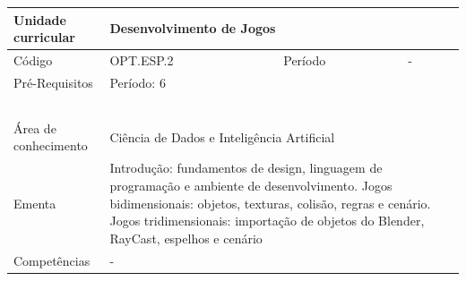 \clearpage
\newpage

\begin{quadro}[ht!]
  \centering\scriptsize
\caption{Unidade Curricular Desenvolvimento de Jogos}

\begin{tabular}{|p{2.5cm}|p{2.5cm}|p{2.5cm}|p{2.5cm}|p{2.5cm}|}\hline

  Unidade curricular & \multicolumn{4}{p{10cm}|}{ Desenvolvimento de Jogos }\\\hline
  Código & OPT.ESP.2 & Período & \multicolumn{2}{p{5cm}|}{ - }\\\hline
  Pré-Requisitos & \multicolumn{4}{p{10cm}|}{ Período: 6 } \\\hline
  \cellcolor{blue1}{ CH PRESENCIAL } &
    \cellcolor{blue1}{CH EAD Síncrona} &
    \cellcolor{blue1}{CH EAD Síncrona Mediada} &
    \cellcolor{blue1}{CH EAD Assíncrona} &
    \cellcolor{blue1}{CH APCC} \\\hline
  \cellcolor{blue1}{ 60 } &
    \cellcolor{blue1}{ 0 } &
    \cellcolor{blue1}{ 30 } &
    \cellcolor{blue1}{ 30 } &
    \cellcolor{blue1}{0} \\\hline
  \cellcolor{blue1}{ CH Teórica } &
    \cellcolor{blue1}{CH Prática} &
    \cellcolor{blue1}{CH Humanidades} &
    \cellcolor{blue1}{CH Extensão} &
    \cellcolor{blue1}{CH EAD TOTAL} \\\hline
  \cellcolor{blue1}{ 30 } &
    \cellcolor{blue1}{ 30 } &
    \cellcolor{blue1}{ 0 } &
    \cellcolor{blue1}{ 0 } &
    \cellcolor{blue1}{ 60 } \\\hline
  \cellcolor{blue1}{CARGA-HORÁRIA TOTAL} & \multicolumn{4}{p{10cm}|}{ \cellcolor{blue1}{ 60 } } \\\hline
  Área de conhecimento & \multicolumn{4}{p{10cm}|}{ Ciência de Dados e Inteligência Artificial } \\\hline
  Ementa & \multicolumn{4}{p{10cm}|}{ Introdução: fundamentos de design, linguagem de programação e ambiente de desenvolvimento. Jogos bidimensionais: objetos, texturas, colisão, regras e cenário. Jogos tridimensionais: importação de objetos do Blender, RayCast, espelhos e cenário } \\\hline
  Competências & \multicolumn{4}{p{10cm}|}{ - } \\\hline


  
	\end{tabular}

\end{quadro}



